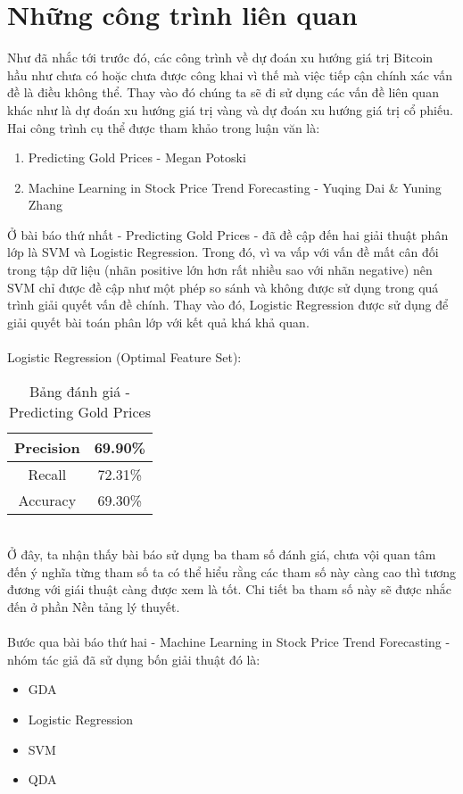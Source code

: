 \chapter{Những công trình liên quan}
Như đã nhắc tới trước đó, các công trình về dự đoán xu hướng giá trị Bitcoin 
hầu như chưa có hoặc chưa được công khai vì thế mà việc tiếp cận chính xác vấn 
đề là điều không thể. Thay vào đó chúng ta sẽ đi sử dụng các vấn đề liên quan 
khác như là dự đoán xu hướng giá trị vàng và dự đoán xu hướng giá trị cổ phiếu.
Hai công trình cụ thể được tham khảo trong luận văn là:
\begin{enumerate}
\item Predicting Gold Prices - Megan Potoski \cite{PredictingGoldPrices}
\item Machine Learning in Stock Price Trend Forecasting - Yuqing Dai \& 
Yuning Zhang \cite{StockPriceTrendForecasting} 
\end{enumerate}
Ở bài báo thứ nhất - Predicting Gold Prices - đã đề cập đến hai giải thuật phân lớp 
là SVM và Logistic Regression. Trong đó, vì va vấp với vấn đề mất cân đối trong tập 
dữ liệu (nhãn positive lớn hơn rất nhiều sao với nhãn negative) nên SVM chỉ được 
đề cập như một phép so sánh và không được sử dụng trong quá trình giải quyết vấn 
đề chính. Thay vào đó, Logistic Regression được sử dụng để giải quyết bài toán 
phân lớp với kết quả khá khả quan.\\\\
Logistic Regression (Optimal Feature Set):
\begin{table}[h]
\centering
\begin{tabular}{ |c|c| }
\hline
Precision & 69.90\% \\
\hline
Recall & 72.31\% \\
\hline
Accuracy & 69.30\% \\
\hline
\end{tabular}
\caption{Bảng đánh giá - Predicting Gold Prices}
\end{table}\\
Ở đây, ta nhận thấy bài báo sử dụng ba tham số đánh giá, chưa vội quan tâm đến 
ý nghĩa từng tham số ta có thể hiểu rằng các tham số này càng cao thì tương 
đương với giái thuật càng được xem là tốt. Chi tiết ba tham số này sẽ được nhắc 
đến ở phần Nền tảng lý thuyết.\\\\
Bước qua bài báo thứ hai - Machine Learning in Stock Price Trend Forecasting - 
nhóm tác giả đã sử dụng bốn giải thuật đó là:\\
\begin{itemize}
\item GDA
\item Logistic Regression
\item SVM 
\item QDA
\end{itemize}
